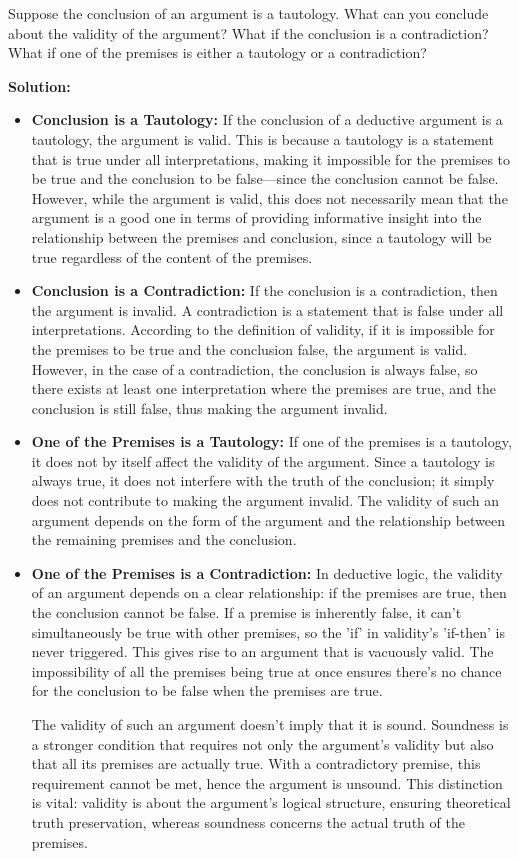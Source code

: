 Suppose the conclusion of an argument is a tautology. What can you conclude about the validity of the argument? What if the conclusion is a contradiction? What if one of the premises is either a tautology or a contradiction?

\textbf{Solution:} 
\begin{itemize}
    \item[] \textbf{Conclusion is a Tautology:} If the conclusion of a deductive argument is a tautology, the argument is valid. This is because a tautology is a statement that is true under all interpretations, making it impossible for the premises to be true and the conclusion to be false—since the conclusion cannot be false. However, while the argument is valid, this does not necessarily mean that the argument is a good one in terms of providing informative insight into the relationship between the premises and conclusion, since a tautology will be true regardless of the content of the premises.
    
    \item[] \textbf{Conclusion is a Contradiction:} If the conclusion is a contradiction, then the argument is invalid. A contradiction is a statement that is false under all interpretations. According to the definition of validity, if it is impossible for the premises to be true and the conclusion false, the argument is valid. However, in the case of a contradiction, the conclusion is always false, so there exists at least one interpretation where the premises are true, and the conclusion is still false, thus making the argument invalid.
    
    \item[] \textbf{One of the Premises is a Tautology:} If one of the premises is a tautology, it does not by itself affect the validity of the argument. Since a tautology is always true, it does not interfere with the truth of the conclusion; it simply does not contribute to making the argument invalid. The validity of such an argument depends on the form of the argument and the relationship between the remaining premises and the conclusion.

    \item[] \textbf{One of the Premises is a Contradiction:} In deductive logic, the validity of an argument depends on a clear relationship: if the premises are true, then the conclusion cannot be false. If a premise is inherently false, it can't simultaneously be true with other premises, so the 'if' in validity's 'if-then' is never triggered. This gives rise to an argument that is vacuously valid. The impossibility of all the premises being true at once ensures there's no chance for the conclusion to be false when the premises are true. 
    
    The validity of such an argument doesn't imply that it is sound. Soundness is a stronger condition that requires not only the argument's validity but also that all its premises are actually true. With a contradictory premise, this requirement cannot be met, hence the argument is unsound. This distinction is vital: validity is about the argument's logical structure, ensuring theoretical truth preservation, whereas soundness concerns the actual truth of the premises.
\end{itemize}